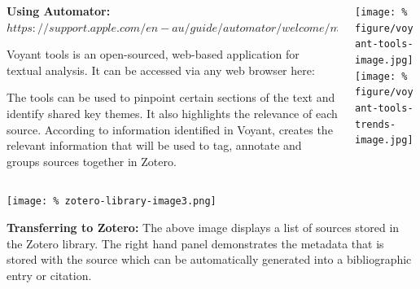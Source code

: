 \documentclass[unknownkeysallowed,usepdftitle=false, parskip=full]{beamer}
\newcommand{\secvariable}{nothing}
\newcommand{\mysection}[1]{\renewcommand{\secvariable}{#1}
}
\begin{document}
\begin{frame}\label{\secvariable}
  \begin{columns}[t]
    \begin{column}[c]{0.50\textwidth}
    \parbox{\linewidth}{

\textbf{Using Automator:} $https://support.apple.com/en-au/guide/automator/welcome/mac$   
 
 Voyant tools is an open-sourced, web-based application for textual analysis. It can be accessed via any web browser here: 
      \vspace{8pt}
      
The tools can be used to pinpoint certain sections of the text and identify shared key themes. It also highlights the relevance of each source. According to information identified in Voyant, creates the relevant information that will be used to tag, annotate and groups sources together in Zotero. 	
      }
    \end{column}
    \begin{column}[c]{0.45\textwidth}
\texttt{[image: \%
figure/voyant-tools-image.jpg]}\\
\vspace{12pt}
\texttt{[image: \%
figure/voyant-tools-trends-image.jpg]}
    \end{column}
  \end{columns}

  
\end{frame}

\mysection{line}
\begin{frame}\label{\secvariable}
\begin{center}
  \vspace{-0.5cm}
 \texttt{[image: \%
  zotero-library-image3.png]}
\end{center}
  \vspace{-0.5cm}
   \textbf{Transferring to Zotero:} The above image displays a list of sources stored in the Zotero library. The right hand panel demonstrates the metadata that is stored with the source which can be automatically generated into a bibliographic entry or citation.    
\end{frame}
\end{document}
